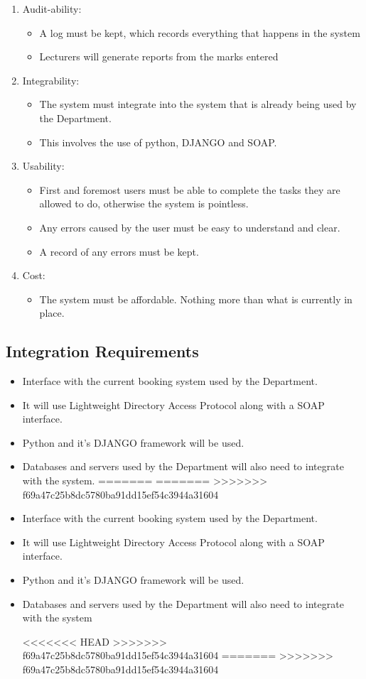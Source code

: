 \begin{enumerate}
\begin{itemize}
\end{itemize}
\item Audit-ability:
\begin{itemize}
\item A log must be kept, which records everything that happens in the system
\item Lecturers will generate reports from the marks entered
\end{itemize}
\item Integrability:
\begin{itemize}
\item The system must integrate into the system that is already being used by the Department.
\item This involves the use of python, DJANGO and SOAP.
\end{itemize}
\item Usability:
\begin{itemize}
\item First and foremost users must be able to complete the tasks they are allowed to do, otherwise the system is pointless.
\item Any errors caused by the user must be easy to understand and clear.
\item A record of any errors must be kept.
\end{itemize}
\item Cost:
\begin{itemize}
\item The system must be affordable. Nothing more than what is currently in place.
\end{itemize}
\end{enumerate}

\subsection{Integration Requirements}

\begin{itemize}
<<<<<<< HEAD
<<<<<<< HEAD
\item Interface with the current booking system used by the Department.
\item It will use Lightweight Directory Access Protocol along with a SOAP interface.
\item Python and it's DJANGO framework will be used.
\item Databases and servers used by the Department will also need to integrate with the system.
=======
=======
>>>>>>> f69a47c25b8dc5780ba91dd15ef54c3944a31604

\item Interface with the current booking system used by the Department.
\item It will use Lightweight Directory Access Protocol along with a SOAP interface.
\item Python and it's DJANGO framework will be used.
\item Databases and servers used by the Department will also need to integrate with the system 

<<<<<<< HEAD
>>>>>>> f69a47c25b8dc5780ba91dd15ef54c3944a31604
=======
>>>>>>> f69a47c25b8dc5780ba91dd15ef54c3944a31604
\end{itemize}
